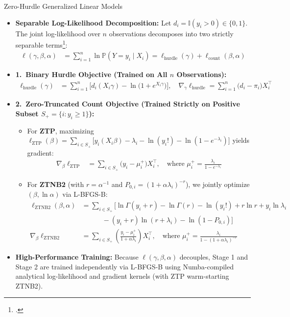 \documentclass[11pt]{beamer}
\begin{document}
\begin{frame}[allowframebreaks]{Zero-Hurdle Generalized Linear Models}
\framebreak
\begin{footnotesize}
\begin{itemize}
\item \textbf{Separable Log-Likelihood Decomposition:} Let $d_i = \mathbb{I}(y_i > 0) \in \{0, 1\}$. The joint log-likelihood over $n$ observations decomposes into two strictly separable terms\footcite[See][for hurdle separability and estimation]{cameron2013}:
\begin{align*}
\ell(\gamma, \beta, \alpha) &= \sum_{i=1}^{n} \ln \mathbb{P}(Y = y_i \mid X_i) = \ell_{\text{hurdle}}(\gamma) + \ell_{\text{count}}(\beta, \alpha)
\end{align*}
\item \textbf{1.\ Binary Hurdle Objective (Trained on All $n$ Observations):}
\begin{align*}
\ell_{\text{hurdle}}(\gamma) &= \sum_{i=1}^{n} \Big[ d_i (X_i\gamma) - \ln\!\big(1 + e^{X_i\gamma}\big) \Big], \quad \nabla_{\gamma}\ell_{\text{hurdle}} = \sum_{i=1}^{n} \big(d_i - \pi_i\big) X_i^{\top}
\end{align*}
\item \textbf{2.\ Zero-Truncated Count Objective (Trained Strictly on Positive Subset $S_{+} = \{i : y_i \geq 1\}$):}
\begin{itemize}
\item For \textbf{ZTP}, maximizing $\ell_{\text{ZTP}}(\beta) = \sum_{i \in S_{+}} \big[y_i (X_i\beta) - \lambda_i - \ln(y_i!) - \ln(1 - e^{-\lambda_i})\big]$ yields gradient:
\begin{align*}
\nabla_{\beta}\ell_{\text{ZTP}} &= \sum_{i \in S_{+}} \big(y_i - \mu_i^{+}\big) X_i^{\top}, \quad \text{where } \mu_i^{+} = \frac{\lambda_i}{1 - e^{-\lambda_i}}
\end{align*}
\item For \textbf{ZTNB2} (with $r = \alpha^{-1}$ and $P_{0,i} = (1 + \alpha\lambda_i)^{-r}$), we jointly optimize $(\beta, \ln\alpha)$ via L-BFGS-B:
\begin{align*}
\ell_{\text{ZTNB2}}(\beta, \alpha) &= \sum_{i \in S_{+}} \Big[\ln\Gamma(y_i + r) - \ln\Gamma(r) - \ln(y_i!) + r\ln r + y_i\ln\lambda_i \\[-2pt]
&\qquad\quad - (y_i + r)\ln(r + \lambda_i) - \ln(1 - P_{0,i})\Big] \\[2pt]
\nabla_{\beta}\ell_{\text{ZTNB2}} &= \sum_{i \in S_{+}} \left(\frac{y_i - \mu_i^{+}}{1 + \alpha\lambda_i}\right) X_i^{\top}, \quad \text{where } \mu_i^{+} = \frac{\lambda_i}{1 - (1 + \alpha\lambda_i)^{-r}}
\end{align*}
\end{itemize}
\item \textbf{High-Performance Training:} Because $\ell(\gamma, \beta, \alpha)$ decouples, Stage 1 and Stage 2 are trained independently via L-BFGS-B using Numba-compiled analytical log-likelihood and gradient kernels (with ZTP warm-starting ZTNB2).
\end{itemize}
\end{footnotesize}
\end{frame}
\end{document}
